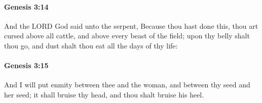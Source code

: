		\paragraph{Genesis 3:14} %
			\label{GENESIS-3-14}

			And the LORD God said unto the serpent, Because thou hast done this, thou art cursed above all cattle, and above every beast of the field; upon thy belly shalt thou go, and dust shalt thou eat all the days of thy life:


		\paragraph{Genesis 3:15} %
			\label{GENESIS-3-15}

			And I will put enmity between thee and the woman, and between thy seed and her seed; it shall bruise thy head, and thou shalt bruise his heel.


